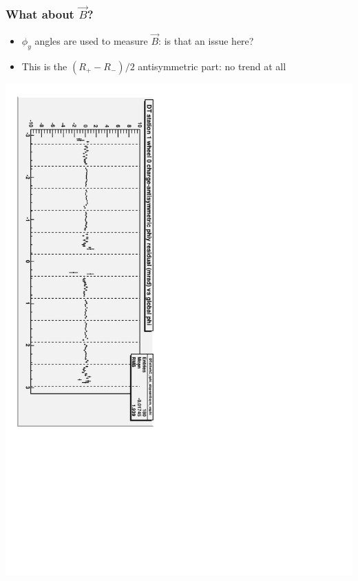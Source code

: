 \documentclass[compress]{beamer}
\begin{document}
\begin{frame}
\frametitle{What about $\vec{B}$?}

\begin{itemize}
\item $\phi_y$ angles are used to measure $\vec{B}$: is that an issue here?
\item This is the $(R_+ - R_-)/2$ antisymmetric part: no trend at all
\end{itemize}

\includegraphics[height=\linewidth, angle=90]{possible_acoplanarity3.pdf}
\end{frame}
\end{document}
